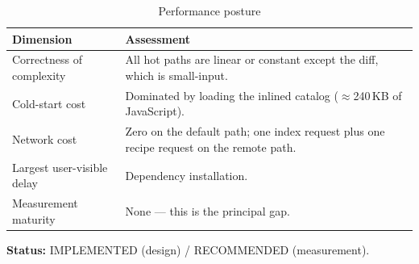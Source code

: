 \begin{table}[H]
\centering
\caption{Performance posture}
\begin{tabular}{p{4.4cm}p{9.8cm}}
\toprule
\textbf{Dimension} & \textbf{Assessment} \\
\midrule
Correctness of complexity & All hot paths are linear or constant except the diff,
which is small-input. \\
Cold-start cost & Dominated by loading the inlined catalog ($\approx$240\,KB of
JavaScript). \\
Network cost & Zero on the default path; one index request plus one recipe
request on the remote path. \\
Largest user-visible delay & Dependency installation. \\
Measurement maturity & None --- this is the principal gap. \\
\bottomrule
\end{tabular}
\end{table}

\textbf{Status:} IMPLEMENTED (design) / RECOMMENDED (measurement).
